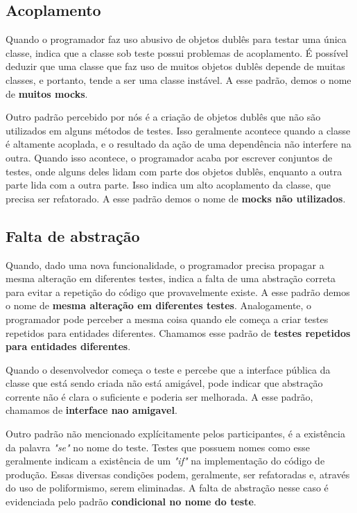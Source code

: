 \subsection{Acoplamento}

Quando o programador faz uso abusivo de objetos dublês para testar uma
única classe, indica que a classe sob teste possui problemas
de acoplamento. É possível deduzir que uma classe que faz uso de muitos
objetos dublês depende de muitas classes, e portanto, tende a ser
uma classe instável. A esse padrão, demos o nome de \textbf{muitos mocks}.

Outro padrão percebido por nós é a criação de objetos dublês que não
são utilizados em alguns métodos de testes. Isso geralmente acontece quando
a classe é altamente acoplada, e o resultado da ação de uma dependência não
interfere na outra. Quando isso acontece, o programador acaba por escrever
conjuntos de testes, onde alguns deles lidam com parte dos objetos dublês,
enquanto a outra parte lida com a outra parte. Isso indica um alto acoplamento 
da classe, que precisa ser refatorado. A esse padrão demos o nome de
\textbf{mocks não utilizados}.


\subsection{Falta de abstração}

Quando, dado uma nova funcionalidade, o programador precisa propagar
a mesma alteração em diferentes testes, indica a falta de uma abstração 
correta para evitar a repetição do código que provavelmente existe. A 
esse padrão demos o nome de \textbf{mesma alteração em diferentes testes}.
Analogamente, o programador pode perceber a mesma coisa
quando ele começa a criar testes repetidos para entidades diferentes.
Chamamos esse padrão de \textbf{testes repetidos para entidades diferentes}.

Quando o desenvolvedor começa o teste e percebe que a interface pública da classe
que está sendo criada não está amigável, pode indicar que abstração
corrente não é clara o suficiente e poderia ser melhorada. A esse padrão,
chamamos de \textbf{interface nao amigavel}.

Outro padrão não mencionado explícitamente pelos participantes, 
é a existência da palavra \textit{"se"} no nome do teste. Testes que
possuem nomes como esse geralmente indicam a existência de um \textit{"if"} na implementação
do código de produção. Essas diversas condições podem, geralmente, ser refatoradas e,
através do uso de poliformismo, serem eliminadas. A falta de abstração nesse caso
é evidenciada pelo padrão \textbf{condicional no nome do teste}.

